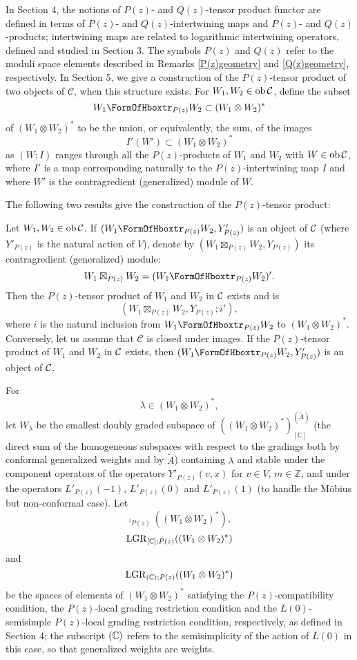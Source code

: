 \documentclass[12pt]{article}
\begin{document}
In Section 4, the notions of $P(z)$- and $Q(z)$-tensor product functor
are defined in terms of $P(z)$- and $Q(z)$-intertwining maps and
$P(z)$- and $Q(z)$-products; intertwining maps are related to
logarithmic intertwining operators, defined and studied in Section
3. The symbols $P(z)$ and $Q(z)$ refer to the moduli space elements
described in Remarks \ref{P(z)geometry} and \ref{Q(z)geometry},
respectively.  In Section 5, we give a construction of the
$P(z)$-tensor product of two objects of $\mathcal{C}$, when this
structure exists.  For $W_{1}, W_{2}\in {\rm ob}\, \mathcal{C}$, define the
subset
\[
W_{1}\hboxtr_{P(z)}W_{2}\subset (W_{1}\otimes W_{2})^{*}
\]
of $(W_{1}\otimes W_{2})^{*}$ to be the union, or equivalently, the
sum, of the images
\[
I'(W')\subset (W_{1}\otimes W_{2})^{*}
\]
as $(W; I)$ ranges through all the $P(z)$-products of $W_{1}$ and
$W_{2}$ with $W\in {\rm ob}\, \mathcal{C}$, where $I'$ is a map corresponding
naturally to the $P(z)$-intertwining map $I$ and where $W'$ is the
contragredient (generalized) module of $W$.

The following two results give the construction of the $P(z)$-tensor
product:

\setcounter{section}{5}
\setcounter{rema}{36}
\begin{propo}
Let $W_{1}, W_{2}\in {\rm ob}\, \mathcal{C}$.  If $(W_1\hboxtr_{P(z)} W_2,
Y'_{P(z)})$ is an object of ${\cal C}$ (where $Y'_{P(z)}$ is the
natural action of $V$), denote by $(W_1\boxtimes_{P(z)} W_2,
Y_{P(z)})$ its contragredient (generalized) module:
\[
W_1\boxtimes_{P(z)} W_2 = (W_1\hboxtr_{P(z)} W_2)'.
\]
Then the $P(z)$-tensor product of $W_{1}$ and $W_{2}$ in ${\cal C}$
exists and is
\[
(W_1\boxtimes_{P(z)} W_2, Y_{P(z)}; i'),
\]
where $i$ is the natural inclusion {}from $W_1\hboxtr_{P(z)} W_2$ to
$(W_1\otimes W_2)^*$.  Conversely, let us assume that $\mathcal{C}$ is
closed under images.  If the $P(z)$-tensor product of $W_1$ and $W_2$
in ${\cal C}$ exists, then $(W_1\hboxtr_{P(z)} W_2, Y'_{P(z)})$ is an
object of ${\cal C}$.
\end{propo}

For 
\[
\lambda
\in (W_{1}\otimes W_{2})^{*},
\]
let $W_{\lambda}$ be the smallest doubly graded subspace of
$((W_1\otimes W_2)^*)_{[ {\mathbb C} ]}^{( \tilde A )}$ (the direct
sum of the homogeneous subspaces with respect to the gradings both by
conformal generalized weights and by $\tilde{A}$) containing $\lambda$
and stable under the component operators of the operators
$Y'_{P(z)}(v,x)$ for $v\in V$, $m\in {\mathbb Z}$, and under the
operators $L'_{P(z)}(-1)$, $L'_{P(z)}(0)$ and $L'_{P(z)}(1)$ (to
handle the M\"{o}bius but non-conformal case).  Let
\[
\comp_{P(z)}((W_1\otimes W_2)^*),
\]
\[
\mathrm{LGR}_{[\mathbb{C}]; P(z)}((W_1\otimes W_2)^*)
\]
and 
\[
\mathrm{LGR}_{(\mathbb{C}); P(z)}((W_1\otimes W_2)^*)
\]
be the spaces of elements of $(W_1\otimes W_2)^*$ satisfying the
$P(z)$-compatibility condition, the $P(z)$-local grading restriction
condition and the $L(0)$-semisimple $P(z)$-local grading restriction
condition, respectively, as defined in Section 4; the subscript $(\mathbb{C})$
refers to the semisimplicity of the action of $L(0)$ in this case, so
that generalized weights are weights.
\end{document}
